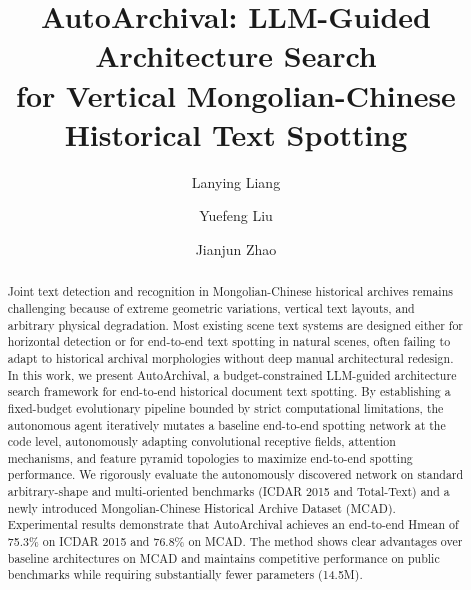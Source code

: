 \documentclass[a4paper,fleqn,longmktitle]{cas-sc}
\begin{document}
\let\WriteBookmarks\relax
\def\floatpagepagefraction{1}
\def\textpagefraction{.001}


\title[mode=title]{AutoArchival: LLM-Guided Architecture Search\\for Vertical Mongolian-Chinese Historical Text Spotting}

\author[1]{Lanying Liang}

\author[2]{Yuefeng Liu}
\cormark[1]

\author[3]{Jianjun Zhao}





\begin{abstract}
Joint text detection and recognition in Mongolian-Chinese historical archives remains challenging because of extreme geometric variations, vertical text layouts, and arbitrary physical degradation. Most existing scene text systems are designed either for horizontal detection or for end-to-end text spotting in natural scenes, often failing to adapt to historical archival morphologies without deep manual architectural redesign. In this work, we present AutoArchival, a budget-constrained LLM-guided architecture search framework for end-to-end historical document text spotting. By establishing a fixed-budget evolutionary pipeline bounded by strict computational limitations, the autonomous agent iteratively mutates a baseline end-to-end spotting network at the code level, autonomously adapting convolutional receptive fields, attention mechanisms, and feature pyramid topologies to maximize end-to-end spotting performance. We rigorously evaluate the autonomously discovered network on standard arbitrary-shape and multi-oriented benchmarks (ICDAR 2015 and Total-Text) and a newly introduced Mongolian-Chinese Historical Archive Dataset (MCAD). Experimental results demonstrate that AutoArchival achieves an end-to-end Hmean of 75.3\% on ICDAR 2015 and 76.8\% on MCAD. The method shows clear advantages over baseline architectures on MCAD and maintains competitive performance on public benchmarks while requiring substantially fewer parameters (14.5M).
\end{abstract}
\end{document}
